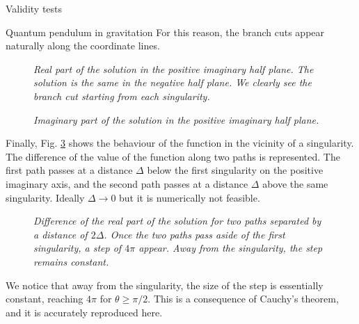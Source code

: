 \begin{section}{Validity tests}
\begin{subsection}{Quantum pendulum in gravitation}
    For this reason, the branch cuts appear naturally along the
    coordinate lines.
    \begin{figure}[!ht]
      \begin{center}
        
        \caption{\em Real part of the solution in the positive
          imaginary half plane. The solution is the same in the
          negative half plane. We clearly see the branch cut starting
          from each singularity.}
        \label{fig:cm_sine_real}
      \end{center}
    \end{figure}

    \begin{figure}[!ht]
      \begin{center}
        
        \caption{\em Imaginary part of the solution in the positive
          imaginary half plane.}
        \label{fig:cm_sine_imag}
      \end{center}
    \end{figure}

    Finally, Fig. \ref{fig:2d_sine_diff} shows the behaviour of the
    function in the vicinity of a singularity. The difference of the
    value of the function along two paths is represented. The first
    path passes at a distance $\Delta$ below the first singularity
    on the positive imaginary axis, and the second path passes at a
    distance $\Delta$ above the same singularity. Ideally $\Delta\to
    0$ but it is numerically not feasible.
    \begin{figure}[!ht]
      \begin{center}
        
        \caption{\em Difference of the real part of the solution for
          two paths separated by a distance of $2\Delta$. Once the two
          paths pass aside of the first singularity, a step of $4\pi$
          appear. Away from the singularity, the step remains
          constant.}
        \label{fig:2d_sine_diff}
      \end{center}
    \end{figure}
    We notice that away from the singularity, the size of the step is
    essentially constant, reaching $4\pi$ for $\theta \geq
    \pi/2$. This is a consequence of Cauchy's theorem, and it is
    accurately reproduced here.
  \end{subsection}
\end{section}
